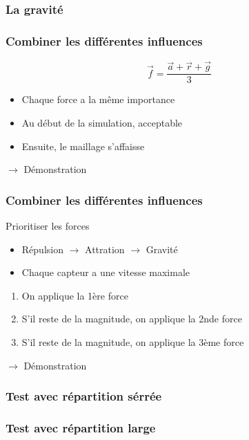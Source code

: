 \documentclass{beamer}
\begin{document}
\begin{frame}

  \frametitle{La gravité}

  \begin{figure}
    
  \end{figure}

\end{frame}

\begin{frame}

  \frametitle{Combiner les différentes influences}

  \begin{equation}
    \vec{f} = \frac{\vec{a} + \vec{r} + \vec{g}}{3}
  \end{equation}

  \vfill

  \begin{block}{}
    \begin{itemize}
    \item{Chaque force a la même importance}
    \item{Au début de la simulation, acceptable}
    \item{Ensuite, le maillage s'affaisse}
    \end{itemize}
  \end{block}

  \vfill

  $\rightarrow$ Démonstration

\end{frame}

\begin{frame}

  \frametitle{Combiner les différentes influences}

  \begin{block}{Prioritiser les forces}

    \begin{itemize}
    \item{Répulsion $\rightarrow$ Attration $\rightarrow$ Gravité}
    \item{Chaque capteur a une vitesse maximale}
    \end{itemize}

    \begin{enumerate}
      \item{On applique la 1ère force}
      \item{S'il reste de la magnitude, on applique la 2nde force}
      \item{S'il reste de la magnitude, on applique la 3ème force}
    \end{enumerate}
  \end{block}

  \vfill

  $\rightarrow$ Démonstration

\end{frame}

\begin{frame}

  \frametitle{Test avec répartition sérrée}

\end{frame}

\begin{frame}

  \frametitle{Test avec répartition large}

\end{frame}
\end{document}
